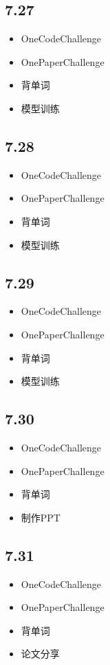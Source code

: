 \documentclass[UTF8]{ctexart}
\begin{document}
\subsection*{7.27}
\begin{itemize}
    \item OneCodeChallenge
    \item OnePaperChallenge
    \item 背单词
    \item 模型训练
\end{itemize}

\subsection*{7.28}
\begin{itemize}
    \item OneCodeChallenge
    \item OnePaperChallenge
    \item 背单词
    \item 模型训练
\end{itemize}

\subsection*{7.29}
\begin{itemize}
    \item OneCodeChallenge
    \item OnePaperChallenge
    \item 背单词
    \item 模型训练
\end{itemize}

\subsection*{7.30}
\begin{itemize}
    \item OneCodeChallenge
    \item OnePaperChallenge
    \item 背单词
    \item 制作PPT
\end{itemize}

\subsection*{7.31}
\begin{itemize}
    \item OneCodeChallenge
    \item OnePaperChallenge
    \item 背单词
    \item 论文分享
\end{itemize}
\end{document}
